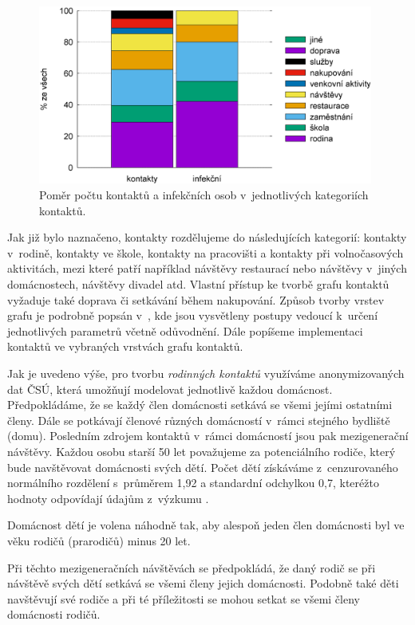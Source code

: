 \begin{figure}
    \centering
    \includegraphics[width=11cm]{pic/filled_cz.eps}
    \caption{Poměr počtu kontaktů a infekčních osob v~jednotlivých kategoriích kontaktů.}
    \label{kategorie}
\end{figure}

Jak již bylo naznačeno, kontakty rozdělujeme do následujících kategorií: kontakty v~rodině, kontakty ve škole, kontakty na pracovišti a kontakty při volnočasových aktivitách, mezi které patří například návštěvy restaurací nebo návštěvy v~jiných domácnostech, návštěvy divadel atd. Vlastní přístup ke tvorbě grafu kontaktů vyžaduje také doprava či setkávání během nakupování. Způsob tvorby vrstev grafu je podrobně popsán v~\cite{M-techrep2021}, kde jsou vysvětleny postupy vedoucí k~určení jednotlivých parametrů včetně odůvodnění. Dále popíšeme implementaci kontaktů ve vybraných vrstvách grafu kontaktů.

Jak je uvedeno výše, pro tvorbu \emph{rodinných kontaktů} využíváme anonymizovaných dat ČSÚ, která umožňují modelovat jednotlivě každou domácnost. Předpokládáme, že se každý člen domácnosti setkává se všemi jejími ostatními členy. Dále se potkávají členové různých domácností v~rámci stejného bydliště (domu). Posledním zdrojem kontaktů v~rámci domácností jsou pak mezigenerační návštěvy.
Každou osobu starší 50 let považujeme za potenciálního rodiče, který bude navštěvovat domácnosti svých dětí. Počet dětí získáváme z~cenzurovaného normálního rozdělení s~průměrem 1,92 a standardní odchylkou 0,7, kteréžto hodnoty odpovídají údajům z~výzkumu \cite{zaj:ess}.

Domácnost dětí je volena náhodně tak, aby alespoň jeden člen domácnosti byl ve věku rodičů (prarodičů) minus 20 let.

Při těchto mezigeneračních návštěvách se předpokládá, že daný rodič se při návštěvě svých dětí setkává se všemi členy jejich domácnosti. Podobně také děti navštěvují své rodiče a při té příležitosti se mohou setkat se všemi členy domácnosti rodičů.

